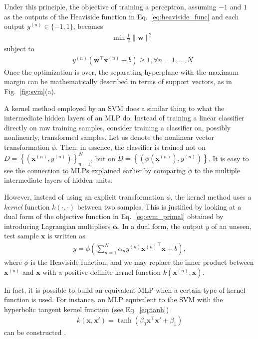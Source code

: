 \documentclass[dissertation,nocontribution,draft*]{aaltoseries}
\newcommand{\vect}[1]{\mathbf{#1}}
\newcommand{\vects}[1]{\boldsymbol{#1}}
\newcommand{\vx}[0]{\vect{x}}
\newcommand{\vw}[0]{\vect{w}}
\newcommand{\valpha}[0]{\vects{\alpha}}
\begin{document}
Under this principle, the objective of training a
perceptron, assuming $-1$ and $1$ as the outputs of the
Heaviside function in Eq.~\eqref{eq:heaviside_func} and each
output $y^{(n)} \in \{ -1, 1 \}$, becomes
\begin{align}
    \label{eq:svm_primal}
    &\min \frac{1}{2} \| \vw \|^2
\end{align}
subject to
\begin{align*}
    &y^{(n)} \left( \vw^\top \vx^{(n)} + b \right) \geq 1,
    \forall n = 1, \dots , N
\end{align*}
Once the optimization is over, the separating hyperplane
with the maximum margin can be mathematically described in
terms of support vectors, as in Fig.~\ref{fig:svm}(a).

A kernel method employed by an SVM does a similar thing to
what the intermediate hidden layers of an MLP do. Instead of
training a linear classifier directly on raw training
samples, consider training a classifier on, possibly
nonlinearly, transformed samples. Let us denote the
nonlinear vector transformation $\phi$. Then, in essence,
the classifier is trained not on $D = \left\{ \left(
\vx^{(n)}, y^{(n)} \right) \right\}_{n=1}^N$, but on
$\tilde{D} = \left\{ \left( \phi(\vx^{(n)}), y^{(n)} \right)
\right\}$. It is easy to see the connection to MLPs
explained earlier by comparing $\phi$ to the multiple
intermediate layers of hidden units.

However, instead of using an explicit transformation $\phi$,
the kernel method uses a \textit{kernel} function $k(\cdot,
\cdot)$ between two samples. This is justified by looking at
a dual form of the objective function in
Eq.~\eqref{eq:svm_primal} obtained by introducing Lagrangian
multipliers $\valpha$.  In a dual form, the output $y$ of an
unseen, test sample $\vx$ is written as
\begin{align*}
    y = \phi \left( \sum_{n=1}^N \alpha_n y^{(n)}
    {\vx^{(n)}}^\top \vx + b \right),
\end{align*}
where $\phi$ is the Heaviside function,
and we may replace the inner product between $\vx^{(n)}$ and
$\vx$  with a positive-definite kernel function
$k(\vx^{(n)}, \vx)$.

In fact, it is possible to build an equivalent MLP when a
certain type of kernel function is used. For instance, an
MLP equivalent to the SVM with the hyperbolic tangent kernel
function (see Eq.~\eqref{eq:tanh})
\begin{align*}
    k(\vx, \vx') = \tanh(\beta_0 \vx^\top \vx' + \beta_1)
\end{align*}
can be constructed \citep[see, e.g.,][]{Haykin2009}. 
\end{document}
